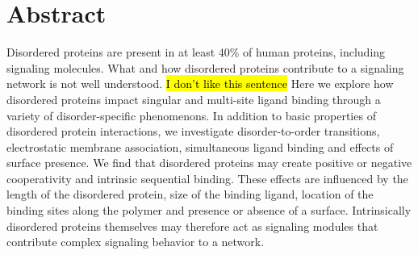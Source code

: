 \documentclass[../AdvancementSummary.tex]{subfiles}
\begin{document}
\section{Abstract}

Disordered proteins are present in at least 40\% of human proteins, including signaling molecules. What and how disordered proteins contribute to a signaling network is not well understood. \hl{I don't like this sentence} Here we explore how disordered proteins impact singular and multi-site ligand binding through a variety of disorder-specific phenomenons. In addition to basic properties of disordered protein interactions, we investigate disorder-to-order transitions, electrostatic membrane association, simultaneous ligand binding and effects of surface presence. We find that disordered proteins may create positive or negative cooperativity and intrinsic sequential binding.  These effects are influenced by the length of the disordered protein, size of the binding ligand, location of the binding sites along the polymer and presence or absence of a surface. Intrinsically disordered proteins themselves may therefore act as signaling modules that contribute complex signaling behavior to a network.
\end{document}
